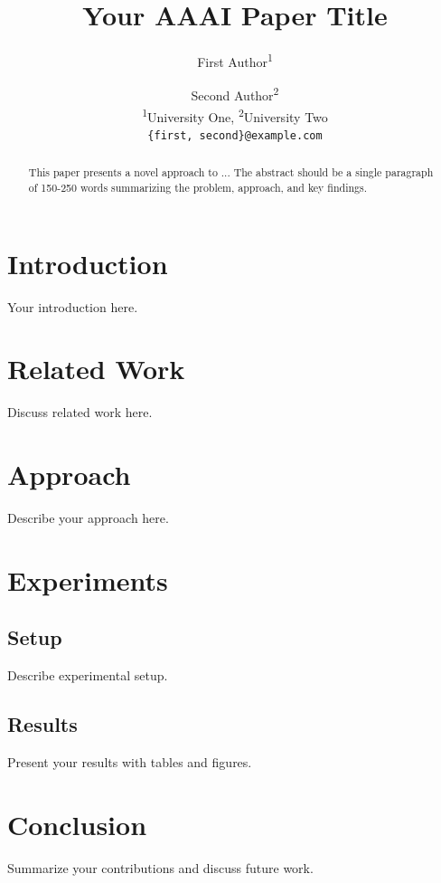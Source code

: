 \documentclass[letterpaper]{article}
\title{Your AAAI Paper Title}
\author{
  First Author\textsuperscript{1} \and
  Second Author\textsuperscript{2} \\
  \textsuperscript{1}University One, \textsuperscript{2}University Two \\
  \texttt{\{first, second\}@example.com}
}
\date{}
\begin{document}
\maketitle

\begin{abstract}
This paper presents a novel approach to ... The abstract should be a single paragraph of 150-250 words summarizing the problem, approach, and key findings.
\end{abstract}

\section{Introduction}
Your introduction here.

\section{Related Work}
Discuss related work here.

\section{Approach}
Describe your approach here.

\section{Experiments}
\subsection{Setup}
Describe experimental setup.

\subsection{Results}
Present your results with tables and figures.

\section{Conclusion}
Summarize your contributions and discuss future work.



\end{document}
